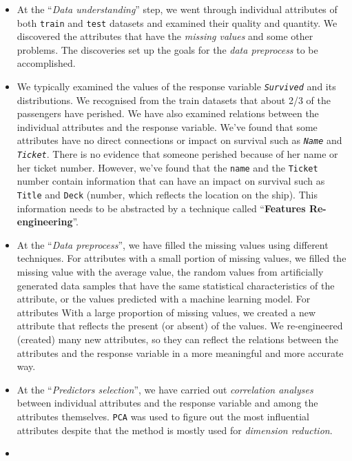 \documentclass[
]{book}
\begin{document}
\begin{itemize}
\item
  At the ``\emph{Data understanding}'' step, we went through individual attributes of both \texttt{train} and \texttt{test} datasets and examined their quality and quantity. We discovered the attributes that have the \emph{missing values} and some other problems. The discoveries set up the goals for the \emph{data preprocess} to be accomplished.
\item
  We typically examined the values of the response variable \emph{\texttt{Survived}} and its distributions. We recognised from the train datasets that about 2/3 of the passengers have perished. We have also examined relations between the individual attributes and the response variable. We've found that some attributes have no direct connections or impact on survival such as \emph{\texttt{Name}} and \emph{\texttt{Ticket}}. There is no evidence that someone perished because of her name or her ticket number. However, we've found that the \texttt{name} and the \texttt{Ticket} number contain information that can have an impact on survival such as \texttt{Title} and \texttt{Deck} (number, which reflects the location on the ship). This information needs to be abstracted by a technique called ``\textbf{Features Re-engineering}''.
\item
  At the ``\emph{Data preprocess}'', we have filled the missing values using different techniques. For attributes with a small portion of missing values, we filled the missing value with the average value, the random values from artificially generated data samples that have the same statistical characteristics of the attribute, or the values predicted with a machine learning model. For attributes With a large proportion of missing values, we created a new attribute that reflects the present (or absent) of the values. We re-engineered (created) many new attributes, so they can reflect the relations between the attributes and the response variable in a more meaningful and more accurate way.
\item
  At the ``\emph{Predictors selection}'', we have carried out \emph{correlation analyses} between individual attributes and the response variable and among the attributes themselves. \texttt{PCA} was used to figure out the most influential attributes despite that the method is mostly used for \emph{dimension reduction}.
\item

\end{itemize}
\end{document}
